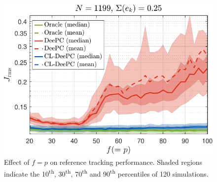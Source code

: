 \begin{figure}[t!]
\begin{center}
\includegraphics[width=\columnwidth]{results/figures/Varying_pf_20-100-41_Nbar_1199_Re_0.25_Ru_1_Rdu_0_Q_100_R_0_dR_10.pdf}    %
\caption{Effect of $f=p$ on reference tracking performance. Shaded regions indicate the 10\textsuperscript{th}, 30\textsuperscript{th}, 70\textsuperscript{th} and 90\textsuperscript{th} percentiles of 120 simulations.}  %
\label{fig:varying_pf}                                 %
\end{center}                                 %
\end{figure}
